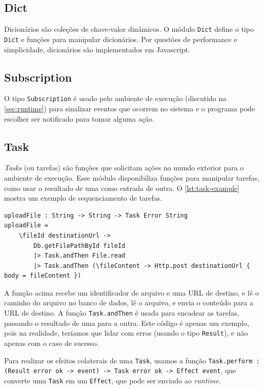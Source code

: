 \subsection{Dict}

Dicionários são coleções de chave-valor dinâmicos. O módulo \texttt{Dict} define
o tipo \texttt{Dict} e funções para manipular dicionários. Por questões de performance
e simplicidade, dicionários são implementados em Javascript.

\subsection{Subscription}

O tipo \texttt{Subscription} é usado pelo ambiente de execução (discutido na
\autoref{sec:runtime}) para sinalizar eventos que ocorrem no sistema e o programa
pode escolher ser notificado para tomar alguma ação.


\subsection{Task}

\textit{Tasks} (ou tarefas) são funções que solicitam ações no mundo exterior para
o ambiente de execução. Esse módulo disponibiliza funções para manipular tarefas,
como usar o resultado de uma como entrada de outra. O \autoref{lst:task-example}
mostra um exemplo de sequenciamento de tarefas.

\begin{lstlisting}[label={lst:task-example},caption={Exemplo de sequenciamento de tarefas}]
uploadFile : String -> String -> Task Error String
uploadFile =
    \fileId destinationUrl ->
        Db.getFilePathById fileId
        |> Task.andThen File.read
        |> Task.andThen (\fileContent -> Http.post destinationUrl { body = fileContent })
\end{lstlisting}

A função acima recebe um identificador de arquivo e uma URL de destino, e lê
o caminho do arquivo no banco de dados, lê o arquivo, e envia o conteúdo para
a URL de destino. A função \texttt{Task.andThen} é usada para encadear as tarefas,
passando o resultado de uma para a outra. Este código é apenas um exemplo, pois
na realidade, teríamos que lidar com erros (usando o tipo \texttt{Result}), e
não apenas com o caso de sucesso.

Para realizar os efeitos colaterais de uma \texttt{Task}, usamos a função
\texttt{Task.perform : (Result error ok -> event) -> Task error ok -> Effect event},
que converte uma \texttt{Task} em um \texttt{Effect}, que pode ser enviado ao
\textit{runtime}.

